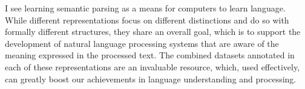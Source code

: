 \documentclass[12pt,a4paper,table]{report}
\newcommand{\heb}[1]{\bgroup\textdir TRT\hebfont #1\egroup}
\begin{document}
I see learning semantic parsing as a means for computers to learn language.
While different representations focus on different distinctions and do so
with formally different structures, they share an overall goal,
which is to support the development of natural language processing systems
that are aware of the meaning expressed in the processed text.
The combined datasets annotated in each of these representations are an invaluable
resource, which, used effectively, can greatly boost our achievements in
language understanding and processing.




\pagebreak
\appendix





\pagebreak

\section*{\flushright{\heb{תקציר}}}
\end{document}
